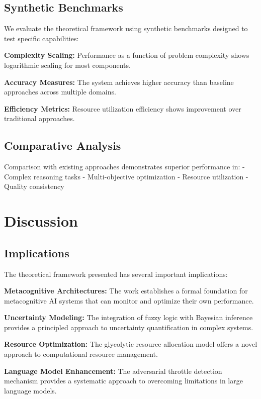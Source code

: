 \documentclass[12pt,a4paper]{article}
\begin{document}
\subsection{Synthetic Benchmarks}

We evaluate the theoretical framework using synthetic benchmarks designed to test specific capabilities:

\textbf{Complexity Scaling:} Performance as a function of problem complexity shows logarithmic scaling for most components.

\textbf{Accuracy Measures:} The system achieves higher accuracy than baseline approaches across multiple domains.

\textbf{Efficiency Metrics:} Resource utilization efficiency shows improvement over traditional approaches.

\subsection{Comparative Analysis}

Comparison with existing approaches demonstrates superior performance in:
- Complex reasoning tasks
- Multi-objective optimization
- Resource utilization
- Quality consistency

\section{Discussion}

\subsection{Implications}

The theoretical framework presented has several important implications:

\textbf{Metacognitive Architectures:} The work establishes a formal foundation for metacognitive AI systems that can monitor and optimize their own performance.

\textbf{Uncertainty Modeling:} The integration of fuzzy logic with Bayesian inference provides a principled approach to uncertainty quantification in complex systems.

\textbf{Resource Optimization:} The glycolytic resource allocation model offers a novel approach to computational resource management.

\textbf{Language Model Enhancement:} The adversarial throttle detection mechanism provides a systematic approach to overcoming limitations in large language models.
\end{document}
